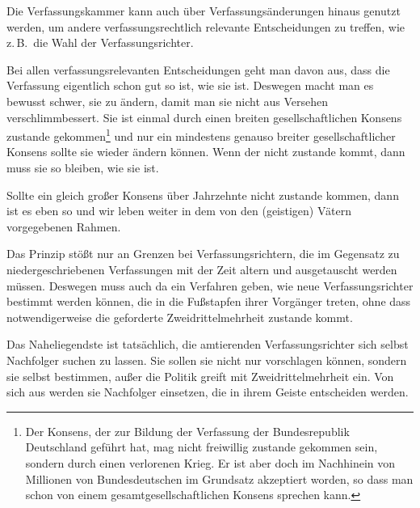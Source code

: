 Die Verfassungskammer kann auch über Verfassungsänderungen hinaus genutzt werden, um andere
verfassungsrechtlich relevante Entscheidungen zu treffen, wie z.\,B.\ die Wahl der
Verfassungsrichter.

Bei allen verfassungsrelevanten Entscheidungen geht man davon aus, dass die Verfassung
eigentlich schon gut so ist, wie sie ist. Deswegen macht man es bewusst schwer, sie zu ändern,
damit man sie nicht aus Versehen verschlimmbessert. Sie ist einmal durch einen breiten
gesellschaftlichen Konsens zustande gekommen\footnote{Der Konsens, der zur Bildung der Verfassung
der Bundesrepublik Deutschland geführt hat, mag nicht freiwillig zustande gekommen sein, sondern
durch einen verlorenen Krieg. Er ist aber doch im Nachhinein von Millionen von Bundesdeutschen im
Grundsatz akzeptiert worden, so dass man schon von einem gesamtgesellschaftlichen Konsens
sprechen kann.} und nur ein mindestens genauso breiter gesellschaftlicher Konsens sollte sie
wieder ändern können. Wenn der nicht zustande kommt, dann muss sie so bleiben, wie sie ist.

Sollte ein gleich großer Konsens über Jahrzehnte nicht zustande kommen, dann ist es eben so und
wir leben weiter in dem von den (geistigen) Vätern vorgegebenen Rahmen.

Das Prinzip stößt nur an
Grenzen bei Verfassungsrichtern, die im Gegensatz zu niedergeschriebenen Verfassungen mit der
Zeit altern und ausgetauscht werden müssen. Deswegen muss auch da ein Verfahren geben, wie neue
Verfassungsrichter bestimmt werden können, die in die Fußstapfen ihrer Vorgänger treten, ohne
dass notwendigerweise die geforderte Zweidrittelmehrheit zustande kommt.

Das Naheliegendste ist
tatsächlich, die amtierenden Verfassungsrichter sich selbst Nachfolger suchen zu lassen. Sie
sollen sie nicht nur vorschlagen können, sondern sie selbst bestimmen, außer die Politik greift
mit Zweidrittelmehrheit ein. Von sich aus werden sie Nachfolger einsetzen, die in ihrem Geiste
entscheiden werden.
